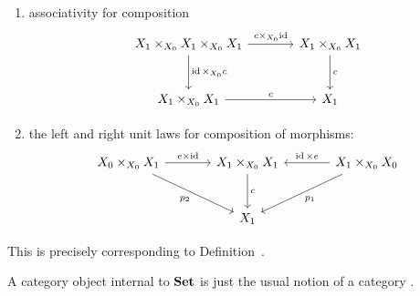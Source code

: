 \begin{node}
\begin{definition}
\begin{enumerate}
\item associativity for composition
\begin{equation*}
\begin{tikzcd}[sep=large]
X_{1}\times_{X_{0}}X_{1}\times_{X_{0}}X_{1}\ar[r,"c\times_{X_{0}}\id"]\ar[d,"\id\times_{X_{0}}c"]&X_{1}\times_{X_{0}}X_{1}\ar[d,"c"]\\
  X_{1}\times_{X_{0}}X_{1}\ar[r,"c"] & X_{1}
\end{tikzcd}
\end{equation*}
\item the left and right unit laws for composition of morphisms:
\begin{equation*}
\begin{tikzcd}[sep=large]
X_{0}\times_{X_{0}} X_{1}\ar[r,"e\times\id"]\ar[dr,swap,"p_{2}"] & X_{1}\times_{X_{0}} X_{1}\ar[d,"c"] & \ar[l,swap,"\id\times e"] X_{1}\times_{X_{0}}X_{0}\ar[dl,"p_{1}"]\\
& X_{1} & 
\end{tikzcd}
\end{equation*}
\end{enumerate}
This is precisely corresponding to Definition~.

\begin{node}[Examples]\label{internal-0001}%
A category object internal to $\mathbf{Set}$ is just the usual notion of a
category .
\end{node}
\end{definition}


\end{node}
